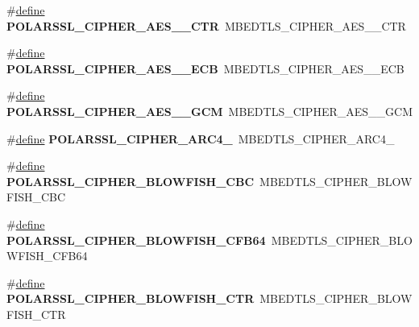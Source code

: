 \begin{DoxyCompactItemize}
\#\hyperlink{structdefine}{define} {\bfseries P\+O\+L\+A\+R\+S\+S\+L\+\_\+\+C\+I\+P\+H\+E\+R\+\_\+\+A\+E\+S\+\_\+\_\+\+C\+TR}~M\+B\+E\+D\+T\+L\+S\+\_\+\+C\+I\+P\+H\+E\+R\+\_\+\+A\+E\+S\+\_\+\_\+\+C\+TR
\item 
\mbox{\label{compat-1_83_8h_a34a1a38e49b01a6792af9611a2043211}} 
\#\hyperlink{structdefine}{define} {\bfseries P\+O\+L\+A\+R\+S\+S\+L\+\_\+\+C\+I\+P\+H\+E\+R\+\_\+\+A\+E\+S\+\_\+\_\+\+E\+CB}~M\+B\+E\+D\+T\+L\+S\+\_\+\+C\+I\+P\+H\+E\+R\+\_\+\+A\+E\+S\+\_\+\_\+\+E\+CB
\item 
\mbox{\label{compat-1_83_8h_a6c41a2794d2c1e3b52bb8447ce6c1c9d}} 
\#\hyperlink{structdefine}{define} {\bfseries P\+O\+L\+A\+R\+S\+S\+L\+\_\+\+C\+I\+P\+H\+E\+R\+\_\+\+A\+E\+S\+\_\+\_\+\+G\+CM}~M\+B\+E\+D\+T\+L\+S\+\_\+\+C\+I\+P\+H\+E\+R\+\_\+\+A\+E\+S\+\_\+\_\+\+G\+CM
\item 
\mbox{\label{compat-1_83_8h_a024be7e0c9cb279be628895a677137c0}} 
\#\hyperlink{structdefine}{define} {\bfseries P\+O\+L\+A\+R\+S\+S\+L\+\_\+\+C\+I\+P\+H\+E\+R\+\_\+\+A\+R\+C4\+\_}~M\+B\+E\+D\+T\+L\+S\+\_\+\+C\+I\+P\+H\+E\+R\+\_\+\+A\+R\+C4\+\_
\item 
\mbox{\label{compat-1_83_8h_a42df8f71714633dd53b46941da997dc4}} 
\#\hyperlink{structdefine}{define} {\bfseries P\+O\+L\+A\+R\+S\+S\+L\+\_\+\+C\+I\+P\+H\+E\+R\+\_\+\+B\+L\+O\+W\+F\+I\+S\+H\+\_\+\+C\+BC}~M\+B\+E\+D\+T\+L\+S\+\_\+\+C\+I\+P\+H\+E\+R\+\_\+\+B\+L\+O\+W\+F\+I\+S\+H\+\_\+\+C\+BC
\item 
\mbox{\label{compat-1_83_8h_a2d072f88144e3fd5ebd4d8a6a9587bb0}} 
\#\hyperlink{structdefine}{define} {\bfseries P\+O\+L\+A\+R\+S\+S\+L\+\_\+\+C\+I\+P\+H\+E\+R\+\_\+\+B\+L\+O\+W\+F\+I\+S\+H\+\_\+\+C\+F\+B64}~M\+B\+E\+D\+T\+L\+S\+\_\+\+C\+I\+P\+H\+E\+R\+\_\+\+B\+L\+O\+W\+F\+I\+S\+H\+\_\+\+C\+F\+B64
\item 
\mbox{\label{compat-1_83_8h_a2d5decbff1af67d0701542361e35eb08}} 
\#\hyperlink{structdefine}{define} {\bfseries P\+O\+L\+A\+R\+S\+S\+L\+\_\+\+C\+I\+P\+H\+E\+R\+\_\+\+B\+L\+O\+W\+F\+I\+S\+H\+\_\+\+C\+TR}~M\+B\+E\+D\+T\+L\+S\+\_\+\+C\+I\+P\+H\+E\+R\+\_\+\+B\+L\+O\+W\+F\+I\+S\+H\+\_\+\+C\+TR
\item 
\mbox{\label{compat-1_83_8h_a60fcc5818261982812538b6e57ed9cf4}} 

\end{DoxyCompactItemize}
